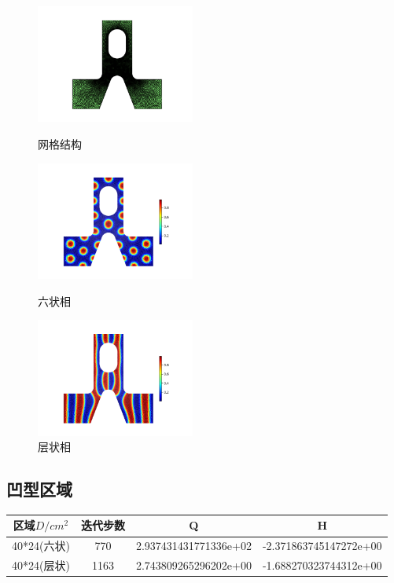 \documentclass[12pt]{article}
\begin{document}
\begin{CJK}{UTF8}{gkai}
\begin{figure}[H]
	\setlength{\abovecaptionskip}{0.cm}
	\setlength{\belowcaptionskip}{-0.cm}
	\begin{minipage}[!htbp]{0.3\linewidth}
		\includegraphics[width=5.2cm]{Figure_buming.png}
		\caption*{网格结构}
	\end{minipage}
	\hspace{0.23in}
	\begin{minipage}[!htbp]{0.3\linewidth}
		\includegraphics[width=5.2cm]{scftfigure340.png}
		\caption*{六状相}
	\end{minipage}
	\hspace{0.23in}
	\begin{minipage}[!htbp]{0.3\linewidth}
		\includegraphics[width=5.2cm]{scftfigure730.png}
		\caption*{层状相}
	\end{minipage}
\end{figure}
\subsection{凹型区域}   
\begin{table}[H]
	\centering
	\begin{tabular}{cccc}
		\toprule
		区域$D/cm^2$ &	迭代步数 & Q &  H \\
		\midrule
		40*24(六状)&770& 2.937431431771336e+02 & -2.371863745147272e+00\\
		40*24(层状)&1163& 2.743809265296202e+00& -1.688270323744312e+00\\
		\bottomrule
	\end{tabular}
\end{table}


\end{CJK}
\end{document}
